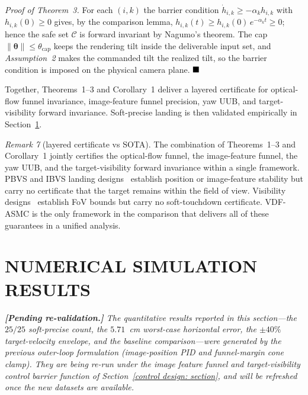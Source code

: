 \documentclass{IEEEtaes}
\begin{document}
\textit{Proof of Theorem~3.} For each $(i,k)$ the barrier condition $\dot{h}_{i,k}\ge-\alpha_k h_{i,k}$ with $h_{i,k}(0)\ge 0$ gives, by the comparison lemma, $h_{i,k}(t)\ge h_{i,k}(0)\,e^{-\alpha_k t}\ge 0$; hence the safe set $\mathcal{C}$ is forward invariant by Nagumo's theorem. The cap $\|\boldsymbol{\theta}\|\le\theta_\text{cap}$ keeps the rendering tilt inside the deliverable input set, and \textit{Assumption~2} makes the commanded tilt the realized tilt, so the barrier condition is imposed on the physical camera plane. $\hfill\blacksquare$

Together, Theorems~1--3 and Corollary~1 deliver a layered certificate for optical-flow funnel invariance, image-feature funnel precision, yaw UUB, and target-visibility forward invariance. Soft-precise landing is then validated empirically in Section~\ref{experimentation: section}.

\textit{Remark 7} (layered certificate vs SOTA). The combination of Theorems~1--3 and Corollary~1 jointly certifies the optical-flow funnel, the image-feature funnel, the yaw UUB, and the target-visibility forward invariance within a single framework. PBVS and IBVS landing designs~\cite{lin2022, zhang2026, cho2022, lin2023} establish position or image-feature stability but carry no certificate that the target remains within the field of view. Visibility designs~\cite{salehi2021, xie2016} establish FoV bounds but carry no soft-touchdown certificate. VDF-ASMC is the only framework in the comparison that delivers all of these guarantees in a unified analysis.


\section{NUMERICAL SIMULATION RESULTS}
\label{experimentation: section}
\textit{\textbf{[Pending re-validation.]} The quantitative results reported in this section---the $25/25$ soft-precise count, the $5.71$~cm worst-case horizontal error, the $\pm 40\%$ target-velocity envelope, and the baseline comparison---were generated by the previous outer-loop formulation (image-position PID and funnel-margin cone clamp). They are being re-run under the image feature funnel and target-visibility control barrier function of Section~\ref{control design: section}, and will be refreshed once the new datasets are available.}
\end{document}
